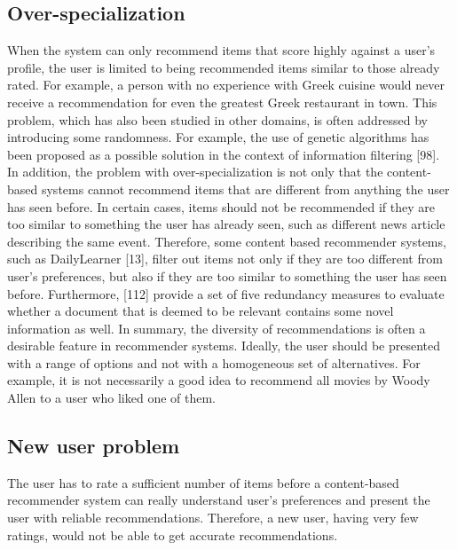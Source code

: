 \subsection{Over-specialization}
When the system can only recommend items that score highly against a user’s profile, the user is limited to being recommended items similar to those already rated. For example, a person with no experience with Greek cuisine would never receive a recommendation for even the greatest Greek restaurant in town. This problem, which has also been studied in other domains, is often addressed by introducing some randomness. For example, the use of genetic algorithms has been proposed as a possible solution in the context of information filtering [98]. In addition, the problem with over-specialization is not only that the content-based systems cannot recommend items that are different from anything the user has seen before. In certain cases, items should not be recommended if they are too similar to something the user has already seen, such as different news article describing the same event. Therefore, some content based recommender systems, such as DailyLearner [13], filter out items not only if they are too different from user’s preferences, but also if they are too similar to something the user has seen before. Furthermore, [112] provide a set of five redundancy measures to evaluate whether a document that is deemed to be relevant contains some novel information as well. In summary, the diversity of recommendations is often a desirable feature in recommender systems. Ideally, the user should be presented with a range of options and not with a homogeneous set of alternatives. For example, it is not necessarily a good idea to recommend all movies by Woody Allen to a user who liked one of them.


\subsection{New user problem}
The user has to rate a sufficient number of items before a content-based recommender system can really understand user’s preferences and present the user with reliable recommendations. Therefore, a new user, having very few ratings, would not be able to get accurate recommendations.

